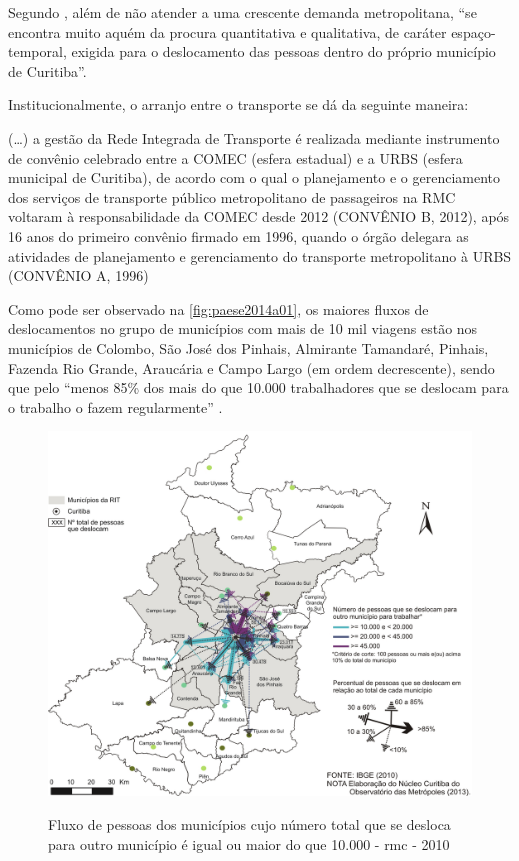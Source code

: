 	Segundo , além de não atender a uma crescente demanda metropolitana, ``se encontra muito aquém da procura quantitativa e qualitativa, de caráter espaço-temporal, exigida para o deslocamento das pessoas dentro do próprio município de Curitiba''.
	
	Institucionalmente, o arranjo entre o transporte se dá da seguinte maneira:
	
	\begin{citacao}
		(\dots) a gestão da Rede Integrada de Transporte é realizada mediante instrumento de convênio celebrado entre a COMEC (esfera estadual) e a URBS (esfera municipal de Curitiba), de acordo com o qual o planejamento e o gerenciamento dos serviços de transporte público metropolitano de passageiros na RMC voltaram à responsabilidade da COMEC desde 2012 (CONVÊNIO B, 2012), após 16 anos do primeiro convênio firmado em 1996, quando o órgão delegara as atividades de planejamento e gerenciamento do transporte metropolitano à URBS (CONVÊNIO A, 1996) \cite[p. 386]{paese2014a}
	\end{citacao}

	Como pode ser observado na \autoref{fig:paese2014a01}, os maiores fluxos de deslocamentos no grupo de municípios com mais de 10 mil viagens estão nos municípios de Colombo, São José dos Pinhais, Almirante Tamandaré, Pinhais, Fazenda Rio Grande, Araucária e Campo Largo (em ordem decrescente), sendo que pelo ``menos 85\% dos mais do que 10.000 trabalhadores que se deslocam para o trabalho o fazem regularmente'' \cite[p. 384]{paese2014a}.
	
	\begin{figure}
		\centering
		\caption{Fluxo de pessoas dos municípios cujo número total que se desloca para outro município é igual ou maior do que 10.000 - \gls{rmc} - 2010}
		\includegraphics[width=0.7\linewidth]{img/paese2014a_01}
		\label{fig:paese2014a01}
	\end{figure}

